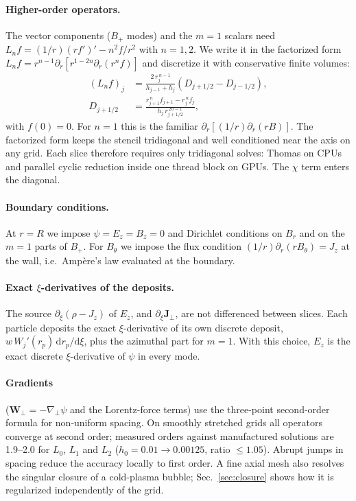\documentclass[aps,prab,reprint,floatfix,superscriptaddress,amsmath,amssymb]{revtex4-2}
\newcommand{\dd}{\mathrm{d}}
\begin{document}
\paragraph{Higher-order operators.} The vector components ($B_+$ modes) and the $m=1$ scalars need $L_n f = (1/r)(r f')' - n^2 f/r^2$ with $n = 1, 2$. We write it in the factorized form $L_n f = r^{n-1}\partial_r\!\left[r^{1-2n}\partial_r(r^n f)\right]$ and discretize it with conservative finite volumes:
\begin{align}
(L_n f)_j &= \frac{2\,r_j^{\,n-1}}{h_{j-1}+h_j}\left(D_{j+1/2} - D_{j-1/2}\right), \label{eq:Ln}\\
D_{j+1/2} &= \frac{r_{j+1}^{\,n} f_{j+1} - r_j^{\,n} f_j}{h_j\, r_{j+1/2}^{\,2n-1}}, \nonumber
\end{align}
with $f(0)=0$. For $n=1$ this is the familiar $\partial_r[(1/r)\partial_r(rB)]$. The factorized form keeps the stencil tridiagonal and well conditioned near the axis on any grid. Each slice therefore requires only tridiagonal solves: Thomas on CPUs and parallel cyclic reduction inside one thread block on GPUs. The $\chi$ term enters the diagonal.

\paragraph{Boundary conditions.} At $r=R$ we impose $\psi = E_z = B_z = 0$ and Dirichlet conditions on $B_r$ and on the $m=1$ parts of $B_+$. For $B_\theta$ we impose the flux condition $(1/r)\partial_r(rB_\theta) = J_z$ at the wall, i.e.\ Amp\`ere's law evaluated at the boundary.

\paragraph{Exact $\xi$-derivatives of the deposits.} The source $\partial_\xi(\rho - J_z)$ of $E_z$, and $\partial_\xi\bm{J}_\perp$, are not differenced between slices. Each particle deposits the exact $\xi$-derivative of its own discrete deposit, $w\,W_j'(r_p)\,\dd r_p/\dd\xi$, plus the azimuthal part for $m=1$. With this choice, $E_z$ is the exact discrete $\xi$-derivative of $\psi$ in every mode.

\paragraph{Gradients} ($\bm{W}_\perp = -\nabla_\perp\psi$ and the Lorentz-force terms) use the three-point second-order formula for non-uniform spacing. On smoothly stretched grids all operators converge at second order; measured orders against manufactured solutions are 1.9--2.0 for $L_0$, $L_1$ and $L_2$ ($h_0 = 0.01\to0.00125$, ratio $\le 1.05$). Abrupt jumps in spacing reduce the accuracy locally to first order. A fine axial mesh also resolves the singular closure of a cold-plasma bubble; Sec.~\ref{sec:closure} shows how it is regularized independently of the grid.
\end{document}
